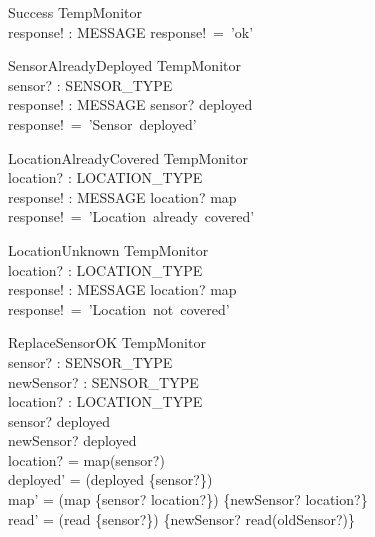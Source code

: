 \documentclass[12pt]{article}
\begin{document}
		
	
		\begin{schema}{Success}
			\Xi TempMonitor\\
			response! : MESSAGE
			\where
			response!~=~'ok'\\
		\end{schema}
		
		
		
		\begin{schema}{SensorAlreadyDeployed}
			\Xi TempMonitor\\
			sensor? : SENSOR\_TYPE\\
			response! : MESSAGE
			\where
			sensor? \in deployed\\
			response!~=~'Sensor~deployed'\\
		\end{schema}
		
		
		
		\begin{schema}{LocationAlreadyCovered}
			\Xi TempMonitor\\
			location? : LOCATION\_TYPE\\
			response! : MESSAGE
			\where
			location? \in \ran map\\
			response!~=~'Location~already~covered'
		\end{schema}
		
		
		
		\begin{schema}{LocationUnknown}
			\Xi TempMonitor\\
			location? : LOCATION\_TYPE\\
			response! : MESSAGE
			\where
			location? \notin \ran map\\
			response!~=~'Location~not~covered'
		\end{schema}
		
		
		
		\begin{schema}{ReplaceSensorOK}
			\Delta TempMonitor\\
			sensor? : SENSOR\_TYPE\\
			newSensor? : SENSOR\_TYPE\\
			location? : LOCATION\_TYPE\\
			\where
			sensor? \in deployed\\
			newSensor? \notin deployed\\
			location? = map(sensor?)\\
			deployed' = (deployed \setminus \{sensor?\}) \\
			map' = (map \setminus \{sensor? \mapsto location?\}) \cup \{newSensor? \mapsto location?\} \\
			read' = (read \setminus \{sensor?\}) \cup \{newSensor? \mapsto read(oldSensor?)\}
		\end{schema}
		
\end{document}
